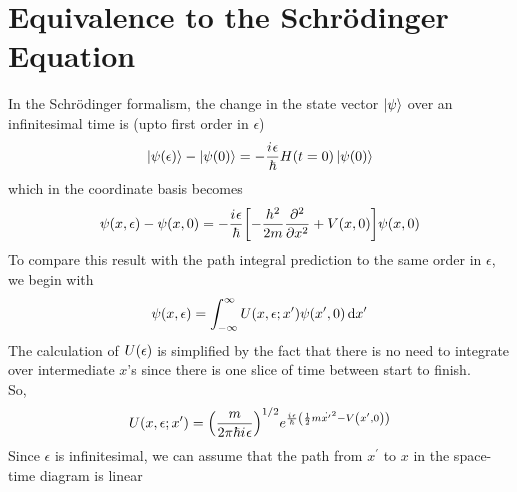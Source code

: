 	\section{Equivalence to the Schr\"{o}dinger Equation}
	In the Schr\"{o}dinger formalism, the change in the state vector $\ket{\psi}$ over an infinitesimal time is (upto first order in $\epsilon$)
	\begin{equation}
		\ket{\psi\qty(\epsilon)} - 		\ket{\psi\qty(0)} = - \frac{{i\mkern1mu} \epsilon}{\hbar} H\qty(t=0)\ket{\psi\qty(0)}
		\label{chapter12.eqn1-equivalence-schrodinger}
	\end{equation}
	which in the coordinate basis becomes
	\begin{equation}
		\psi\qty(x, \epsilon) - \psi\qty(x, 0) = - \frac{{i\mkern1mu} \epsilon}{\hbar}\qty[-\frac{h^2}{2 m}\pdv[2]{x} + V\qty(x, 0)] \psi\qty(x, 0)
		\label{chapter12.eqn2-equivalence-schrodinger}
	\end{equation}
	To compare this result with the path integral prediction to the same order in $\epsilon$, we begin with
	\begin{equation}
		\psi\qty(x, \epsilon) = \int_{-\infty}^{\infty} U(x, \epsilon; x^\prime) \psi\qty(x^\prime, 0) \dd{x^\prime}
		\label{chapter12.eqn3-equivalence-schrodinger}
	\end{equation}
	The calculation of $U\qty(\epsilon)$ is simplified by the fact that there is no need to integrate over intermediate $x$'s since there is one slice of time between start to finish.\\
	
	So,
	\begin{equation}
		U\qty(x, \epsilon; x^\prime) = \qty(\frac{m}{2\pi \hbar {i\mkern1mu} \epsilon})^{1/2} e^{\frac{{i\mkern1mu} \epsilon}{\hbar}\qty(\frac{1}{2} m \dot{x^\prime}^2 - V\qty(x^\prime, 0))}
		\label{chapter12.eqn4-equivalence-schrodinger}
	\end{equation}
	Since $\epsilon$ is infinitesimal, we can assume that the path from $x^\prime$ to $x$ in the space-time diagram is linear
	
